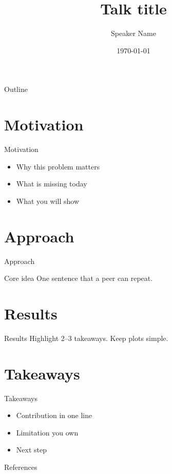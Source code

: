\documentclass[aspectratio=169]{beamer}
\title[Short title]{Talk title}
\author[Speaker]{Speaker Name}
\institute[Lab]{Lab / University}
\date{\today}
\begin{document}
\begin{frame}
  \titlepage
\end{frame}

\begin{frame}{Outline}
  \tableofcontents
\end{frame}

\section{Motivation}
\begin{frame}{Motivation}
  \begin{itemize}
    \item Why this problem matters
    \item What is missing today
    \item What you will show
  \end{itemize}
\end{frame}

\section{Approach}
\begin{frame}{Approach}
  \begin{block}{Core idea}
    One sentence that a peer can repeat.
  \end{block}
\end{frame}

\section{Results}
\begin{frame}{Results}
  Highlight 2--3 takeaways. Keep plots simple.
\end{frame}

\section{Takeaways}
\begin{frame}{Takeaways}
  \begin{itemize}
    \item Contribution in one line
    \item Limitation you own
    \item Next step
  \end{itemize}
\end{frame}

\begin{frame}[allowframebreaks]{References}
  \printbibliography
\end{frame}
\end{document}
